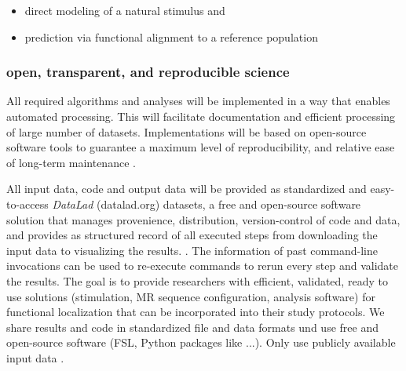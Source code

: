 \begin{itemize}
    \item direct modeling of a natural stimulus and
    \item prediction via functional alignment to a reference population
\end{itemize}


\subsubsection{open, transparent, and reproducible science}





%
All required algorithms and analyses will be implemented in a way that enables
automated processing.
%
This will facilitate documentation and efficient processing of large number of
datasets.
%
Implementations will be based on open-source software tools to guarantee a
maximum level of reproducibility, and relative ease of long-term maintenance
\citep{eglen2017toward}.

All input data, code and output data will be provided as standardized and
easy-to-access \textit{DataLad} (datalad.org) datasets, a free and open-source software
solution that manages provenience, distribution, version-control of code and
data, and provides as structured record of all executed steps from downloading
the input data to visualizing the results.
\citep{halchenko2021datalad}. The information of past command-line invocations
can be used to re-execute commands to rerun every step and validate the results.
%
The goal is to provide researchers with efficient, validated, ready to use
solutions (stimulation, MR sequence configuration, analysis software) for
functional localization that can be incorporated into their study protocols.
%
We share results and code in standardized file and data formats und use free and
open-source software (FSL, Python packages like ...). Only use publicly
available input data \citep{eglen2017toward}.

